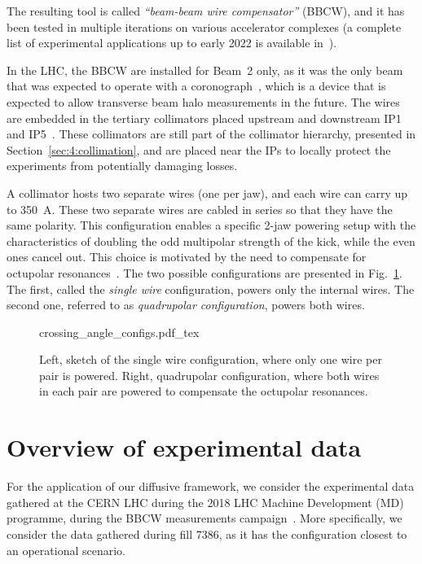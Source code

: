 The resulting tool is called \textit{``beam-beam wire compensator''} (BBCW), and it has been tested in multiple iterations on various accelerator complexes (a complete list of experimental applications up to early 2022 is available in~\cite{axel.wires}).

In the LHC, the BBCW are installed for Beam~2 only, as it was the only beam that was expected to operate with a coronograph~\cite{Goldblatt:2313940}, which is a device that is expected to allow transverse beam halo measurements in the future. The wires are embedded in the tertiary collimators placed upstream and downstream IP1 and IP5~\cite{Rossi:2696270}. These collimators are still part of the collimator hierarchy, presented in Section~\ref{sec:4:collimation}, and are placed near the IPs to locally protect the experiments from potentially damaging losses.

A collimator hosts two separate wires (one per jaw), and each wire can carry up to \SI{350}{\ampere}. These two separate wires are cabled in series so that they have the same polarity. This configuration enables a specific 2-jaw powering setup with the characteristics of doubling the odd multipolar strength of the kick, while the even ones cancel out. This choice is motivated by the need to compensate for octupolar resonances~\cite{Poyet:2703503}. The two possible configurations are presented in Fig.~\ref{fig:wire-configs}. The first, called the \textit{single wire} configuration, powers only the internal wires. The second one, referred to as \textit{quadrupolar configuration}, powers both wires.

\begin{figure}[hpt]
    \centering
    \def\svgwidth{1.0\textwidth}
    {crossing_angle_configs.pdf_tex}
    \caption{Left, sketch of the single wire configuration, where only one wire per pair is powered. Right, quadrupolar configuration, where both wires in each pair are powered to compensate the octupolar resonances.}
    \label{fig:wire-configs}
\end{figure}

\section{Overview of experimental data}\label{sec:5:wire-data}

For the application of our diffusive framework, we consider the experimental data gathered at the CERN LHC during the 2018 LHC Machine Development (MD) programme, during the BBCW measurements campaign~\cite{Poyet:2703503}. More specifically, we consider the data gathered during fill 7386, as it has the configuration closest to an operational scenario.

